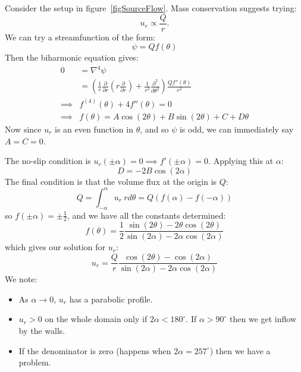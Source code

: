 \documentclass[../Main.tex]{subfiles}
\begin{document}
\begin{example}
    \label{exSourceFlow}
    Consider the setup in figure~\ref{figSourceFlow}. Mass conservation suggests trying:
    \begin{equation*}
        u_r \propto \frac{Q}{r}.
    \end{equation*}
    We can try a streamfunction of the form:
    \begin{equation*}
        \psi = Qf(\theta)
    \end{equation*}
    Then the biharmonic equation gives:
    \begin{align*}
        0 &= \nabla^4 \psi \\
        &= \left(\frac1r \frac{\partial }{\partial r} \left(r \frac{\partial}{\partial r}\right) + \frac1{r^2} \frac{\partial^2 }{\partial \theta^2}\right) \frac{Qf''(\theta)}{r^2} \\
        \implies& f^{(4)}(\theta) + 4 f''(\theta) = 0 \\
        \implies& f(\theta) = A\cos(2\theta) + B \sin(2\theta) + C + D\theta
    \end{align*}
    Now since $u_r$ is an even function in $\theta$, and so $\psi$ is odd, we can immediately say $A = C = 0$.
    
    The no-slip condition is $u_r(\pm \alpha) = 0 \implies f'(\pm \alpha) = 0$. Applying this at $\alpha$:
    \begin{equation*}
        D = -2B\cos(2\alpha)
    \end{equation*}
    The final condition is that the volume flux at the origin is $Q$:
    \begin{equation*}
        Q = \int_{-\alpha}^{\alpha} u_r~r d\theta = Q(f(\alpha) - f(-\alpha))
    \end{equation*}
    so $f(\pm \alpha) = \pm \frac12$, and we have all the constants determined:
    \begin{equation*}
        f(\theta) = \frac12 \frac{\sin(2\theta) - 2\theta \cos(2\theta)}{\sin(2\alpha) - 2\alpha \cos(2\alpha)}
    \end{equation*}
    which gives our solution for $u_r$:
    \begin{equation*}
        u_r = \frac{Q}{r} \frac{\cos(2\theta) - \cos(2\alpha)}{\sin(2\alpha) - 2\alpha \cos(2\alpha)}
    \end{equation*}
    We note:
    \begin{itemize}
        \item As $\alpha \to 0$, $u_r$ has a parabolic profile.
        \item $u_r > 0$ on the whole domain only if $2\alpha < 180^\circ$. If $\alpha > 90^\circ$ then we get inflow by the walls.
        \item If the denominator is zero (happens when $2\alpha = 257^\circ$) then we have a problem.
    \end{itemize}
\end{example}
\end{document}
